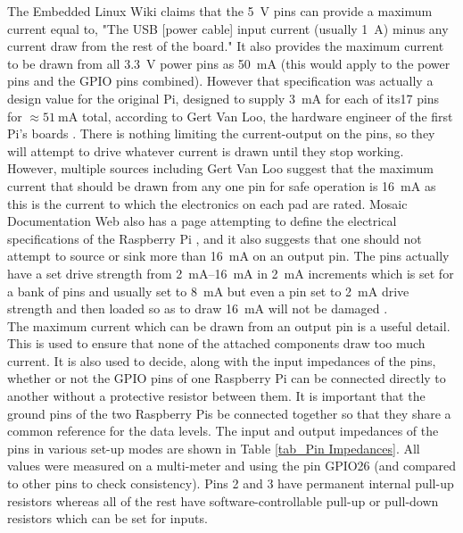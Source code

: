 \documentclass[../main.tex]{subfiles}
\begin{document}
The Embedded Linux Wiki claims that the \SI{5}{\volt} pins can provide a maximum current equal to, "The USB [power cable] input current (usually \SI{1}{\ampere}) minus any current draw from the rest of the board." \cite{web_RpiMaxRatings}
It also provides the maximum current to be drawn from all \SI{3.3}{\volt} power pins as \SI{50}{\milli\ampere} (this would apply to the power pins and the GPIO pins combined).
However that specification was actually a design value for the original Pi, designed to supply \SI{3}{\milli\ampere} for each of its17 pins for $\approx \SI{51}{\milli\ampere}$ total, according to Gert Van Loo, the hardware engineer of the first Pi's boards \cite{web_RPiSpecsSE}.
There is nothing limiting the current-output on the pins, so they will attempt to drive whatever current is drawn until they stop working.
However, multiple sources including Gert Van Loo suggest that the maximum current that should be drawn from any one pin for safe operation is \SI{16}{\milli\ampere} as this is the current to which the electronics on each pad are rated.
Mosaic Documentation Web also has a page attempting to define the electrical specifications of the Raspberry Pi \cite{web_MosaicSpecs}, and it also suggests that one should not attempt to source or sink more than \SI{16}{\milli\ampere} on an output pin.
The pins actually have a set drive strength from \SIrange{2}{16}{\milli\ampere} in \SI{2}{\milli\ampere} increments which is set for a bank of pins and usually set to \SI{8}{\milli\ampere} but even a pin set to \SI{2}{\milli\ampere} drive strength and then loaded so as to draw \SI{16}{\milli\ampere} will not be damaged \cite{web_GPIOPadsErrata}.\\

The maximum current which can be drawn from an output pin is a useful detail.
This is used to ensure that none of the attached components draw too much current.
It is also used to decide, along with the input impedances of the pins, whether or not the GPIO pins of one Raspberry Pi can be connected directly to another without a protective resistor between them.
It is important that the ground pins of the two Raspberry Pis be connected together so that they share a common reference for the data levels.
The input and output impedances of the pins in various set-up modes are shown in Table \ref{tab_Pin Impedances}.
All values were measured on a multi-meter and using the pin GPIO26 (and compared to other pins to check consistency).
Pins 2 and 3 have permanent internal pull-up resistors whereas all of the rest have software-controllable pull-up or pull-down resistors which can be set for inputs.\\
\end{document}
